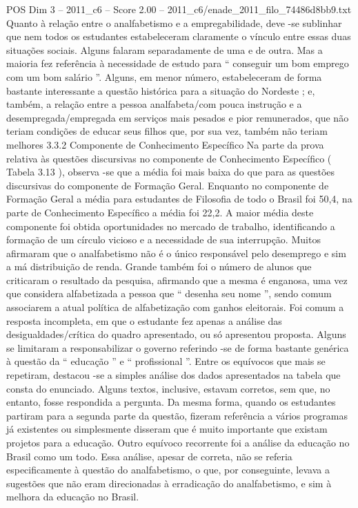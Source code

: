 \begin{textsample}{POS Dim 3 – 2011\_c6 – Score 2.00 – 2011\_c6/enade\_2011\_filo\_74486d8bb9.txt}
Quanto à relação entre o analfabetismo e a empregabilidade, deve -se sublinhar que nem todos os estudantes estabeleceram claramente o vínculo entre essas duas situações sociais.
Alguns falaram separadamente de uma e de outra.
Mas a maioria fez referência à necessidade de estudo para “ conseguir um bom emprego com um bom salário ”.
Alguns, em menor número, estabeleceram de forma bastante interessante a questão histórica para a situação do Nordeste ; e, também, a relação entre a pessoa analfabeta/com pouca instrução e a desempregada/empregada em serviços mais pesados e pior remunerados, que não teriam condições de educar seus filhos que, por sua vez, também não teriam melhores 3.3.2 Componente de Conhecimento Específico Na parte da prova relativa às questões discursivas no componente de Conhecimento Específico ( Tabela 3.13 ), observa -se que a média foi mais baixa do que para as questões discursivas do componente de Formação Geral.
Enquanto no componente de Formação Geral a média para estudantes de Filosofia de todo o Brasil foi 50,4, na parte de Conhecimento Específico a média foi 22,2.
A maior média deste componente foi obtida oportunidades no mercado de trabalho, identificando a formação de um círculo vicioso e a necessidade de sua interrupção.
Muitos afirmaram que o analfabetismo não é o único responsável pelo desemprego e sim a má distribuição de renda.
Grande também foi o número de alunos que criticaram o resultado da pesquisa, afirmando que a mesma é enganosa, uma vez que considera alfabetizada a pessoa que “ desenha seu nome ”, sendo comum associarem a atual política de alfabetização com ganhos eleitorais.
Foi comum a resposta incompleta, em que o estudante fez apenas a análise das desigualdades/crítica do quadro apresentado, ou só apresentou proposta.
Alguns se limitaram a responsabilizar o governo referindo -se de forma bastante genérica à questão da “ educação ” e “ profissional ”.
Entre os equívocos que mais se repetiram, destacou -se a simples análise dos dados apresentados na tabela que consta do enunciado.
Alguns textos, inclusive, estavam corretos, sem que, no entanto, fosse respondida a pergunta.
Da mesma forma, quando os estudantes partiram para a segunda parte da questão, fizeram referência a vários programas já existentes ou simplesmente disseram que é muito importante que existam projetos para a educação.
Outro equívoco recorrente foi a análise da educação no Brasil como um todo.
Essa análise, apesar de correta, não se referia especificamente à questão do analfabetismo, o que, por conseguinte, levava a sugestões que não eram direcionadas à erradicação do analfabetismo, e sim à melhora da educação no Brasil.

\end{textsample}
